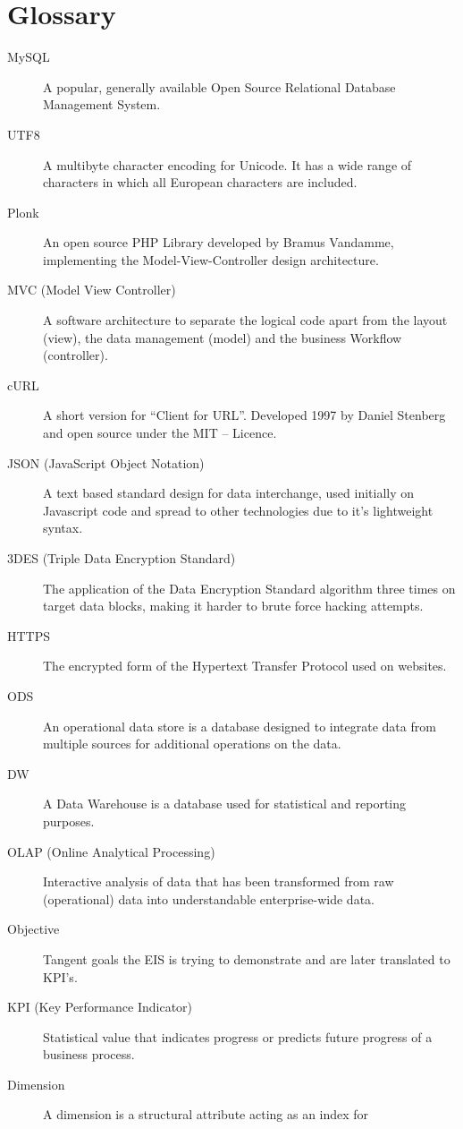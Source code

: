 \chapter*{Glossary}
\begin{description}
\item[MySQL] A popular, generally available Open Source Relational Database
Management System.
\item[UTF8] A multibyte character encoding for Unicode. It has a wide range of
characters in which all European characters are included.
\item[Plonk] An open source PHP Library developed by Bramus Vandamme,
implementing the Model-View-Controller design architecture.
\item[MVC (Model View Controller)] A software architecture to separate the
logical code apart from the layout (view), the data management (model) and the
business Workflow (controller).
\item[cURL] A short version for “Client for URL”. Developed 1997 by Daniel
Stenberg and open source under the MIT – Licence.
\item[JSON (JavaScript Object Notation)] A text based standard design for data
interchange, used initially on Javascript code and spread to other technologies
due to it's lightweight syntax.
\item[3DES (Triple Data Encryption Standard)] The application of the Data
Encryption Standard algorithm three times on target data blocks, making it
harder to brute force hacking attempts. 
\item[HTTPS] The encrypted form of the Hypertext Transfer Protocol used on
websites.
\item[ODS] An operational data store is a database designed to integrate
data from multiple sources for additional operations on the data.
\item[DW] A Data Warehouse is a database used for statistical and reporting
purposes.
\item[OLAP (Online Analytical Processing)] Interactive analysis of data that
has been transformed from raw (operational) data into understandable 
enterprise-wide data.
\item[Objective] Tangent goals the EIS is trying to demonstrate and are later
translated to KPI's.
\item[KPI (Key Performance Indicator)] Statistical value that indicates
progress or predicts future progress of a business process.
\item[Dimension] A dimension is a structural attribute acting as an index for

\end{description}
